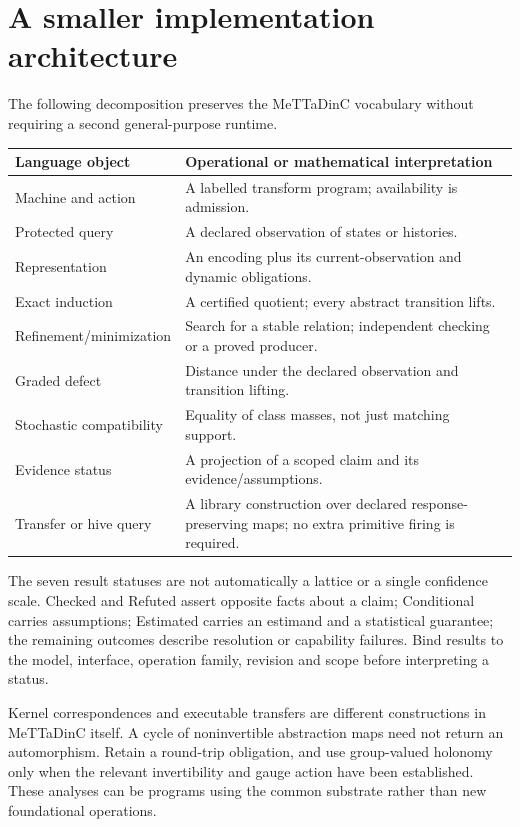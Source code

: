 \documentclass[11pt]{article}
\begin{document}
\section{A smaller implementation architecture}
The following decomposition preserves the MeTTaDinC vocabulary without
requiring a second general-purpose runtime.
\begin{center}\small
\begin{tabularx}{\textwidth}{@{}p{}X@{}}
\toprule
Language object & Operational or mathematical interpretation\\
\midrule
Machine and action & A labelled transform program; availability is admission.\\
Protected query & A declared observation of states or histories.\\
Representation & An encoding plus its current-observation and dynamic obligations.\\
Exact induction & A certified quotient; every abstract transition lifts.\\
Refinement/minimization & Search for a stable relation; independent checking or a proved producer.\\
Graded defect & Distance under the declared observation and transition lifting.\\
Stochastic compatibility & Equality of class masses, not just matching support.\\
Evidence status & A projection of a scoped claim and its evidence/assumptions.\\
Transfer or hive query & A library construction over declared response-preserving maps; no extra primitive firing is required.\\
\bottomrule
\end{tabularx}
\end{center}

The seven result statuses are not automatically a lattice or a single
confidence scale. Checked and Refuted assert opposite facts about a claim;
Conditional carries assumptions; Estimated carries an estimand and a
statistical guarantee; the remaining outcomes describe resolution or
capability failures. Bind results to the model, interface, operation family,
revision and scope before interpreting a status.

Kernel correspondences and executable transfers are different constructions
in MeTTaDinC itself. A cycle of noninvertible abstraction maps need not return
an automorphism. Retain a round-trip obligation, and use group-valued holonomy
only when the relevant invertibility and gauge action have been established.
These analyses can be programs using the common substrate rather than new
foundational operations.
\end{document}
